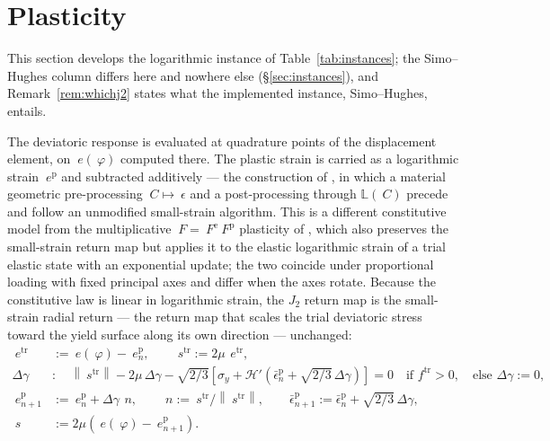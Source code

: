 \documentclass[11pt]{article}
\newcommand{\F}{~F}
\newcommand{\C}{~C}
\newcommand{\eps}{~\epsilon}
\newcommand{\edev}{~e}
\newcommand{\sdev}{~s}
\newcommand{\disp}{~\varphi}
\newcommand{\norm}[1]{\left\lVert #1 \right\rVert}
\theoremstyle{definition}
\theoremstyle{plain}
\begin{document}
\section{Plasticity}
\label{sec:plasticity}

This section develops the logarithmic instance of Table~\ref{tab:instances};
the Simo--Hughes column differs here and nowhere else (\S\ref{sec:instances}),
and Remark~\ref{rem:whichj2} states what the implemented instance,
Simo--Hughes, entails.

The deviatoric response is evaluated at quadrature points of the displacement
element, on $\edev(\disp)$ computed there. The plastic strain is carried as a
logarithmic strain $\edev^{\mathrm p}$ and subtracted additively --- the
construction of \citet{Miehe.Apel.Lambrecht:2002}, in which a material
geometric pre-processing $\C \mapsto \eps$ and a post-processing through
$\mathbb{L}(\C)$ precede and follow an unmodified small-strain algorithm. This is a
different constitutive model from the multiplicative $\F = \F^{\mathrm e}
\F^{\mathrm p}$ plasticity of \citet{Simo:1992}, which also preserves the
small-strain return map but applies it to the elastic logarithmic strain of a
trial elastic state with an exponential update; the two coincide under
proportional loading with fixed principal axes and differ when the axes rotate.
Because
the constitutive law is linear in logarithmic strain, the $J_2$ return map is
the small-strain radial return --- the return map that scales the trial
deviatoric stress toward the yield surface along its own direction ---
unchanged:
\begin{equation}
  \label{eq:return}
  \begin{split}
    \edev^{\mathrm{tr}} &:= \edev(\disp) - \edev^{\mathrm p}_n,
    \qquad
    \sdev^{\mathrm{tr}} := 2\mu\,\edev^{\mathrm{tr}},
    \\
    \Delta\gamma &: \quad
      \norm{\sdev^{\mathrm{tr}}} - 2\mu\,\Delta\gamma
      - \sqrt{2/3}\left[\sigma_y + \mathcal{H}'\!\left(\bar\epsilon^{\mathrm p}_n + \sqrt{2/3}\,\Delta\gamma\right)\right] = 0
      \quad\text{if } f^{\mathrm{tr}} > 0, \quad \text{else } \Delta\gamma := 0,
    \\
    \edev^{\mathrm p}_{n+1} &:= \edev^{\mathrm p}_n + \Delta\gamma\, ~n,
    \qquad ~n := \sdev^{\mathrm{tr}} / \norm{\sdev^{\mathrm{tr}}},
    \qquad
    \bar\epsilon^{\mathrm p}_{n+1} := \bar\epsilon^{\mathrm p}_n + \sqrt{2/3}\,\Delta\gamma,
    \\
    \sdev &:= 2\mu\left(\edev(\disp) - \edev^{\mathrm p}_{n+1}\right).
  \end{split}
\end{equation}
\end{document}
